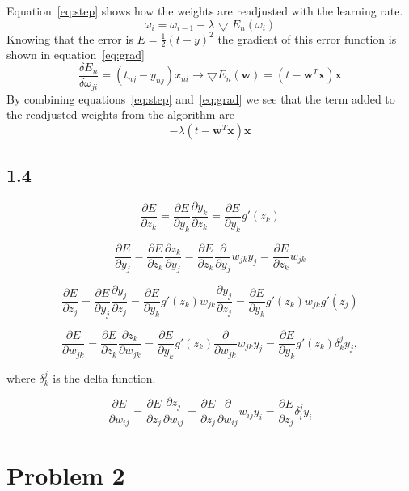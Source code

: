 \documentclass{article}
\begin{document}
Equation~\eqref{eq:step} shows how the weights are readjusted with the learning rate. 
\begin{equation}
\omega_i = \omega_{i-1} - \lambda\bigtriangledown E_n(\omega_i)
\label{eq:step}
\end{equation}
Knowing that the error is $E=\frac{1}{2}(t-y)^2$ the gradient of this error function is shown in equation~\eqref{eq:grad}
\begin{equation}
	\frac{\delta E_n}{\delta \omega_{ji}} = (t_{nj} - y_{nj})x_{ni} \rightarrow \bigtriangledown E_n(\textbf{w}) = (t - \textbf{w}^T\textbf{x})\textbf{x}
	\label{eq:grad}
\end{equation}
By combining equations~\eqref{eq:step} and~\eqref{eq:grad} we see that the term added to the readjusted weights from the algorithm are
\begin{equation*}
	-\lambda(t - \textbf{w}^T\textbf{x})\textbf{x}
	\label{eq:addterm}
\end{equation*}

\subsection*{1.4}

\begin{equation}
\frac{\partial E}{\partial z_k} = \frac{\partial E}{\partial y_k} \frac{\partial y_k}{\partial z_k} = \frac{\partial E}{\partial y_k} g'(z_k)
\end{equation}

\begin{equation}
\frac{\partial E}{\partial y_j} = \frac{\partial E}{\partial z_k} \frac{\partial z_k}{\partial y_j} =
\frac{\partial E}{\partial z_k} \frac{\partial}{\partial y_j} w_{jk} y_j =\frac{\partial E}{\partial z_k} w_{jk}
\end{equation}

\begin{equation}
\frac{\partial E}{\partial z_j} = \frac{\partial E}{\partial y_j} \frac{\partial y_j}{\partial z_j} = \frac{\partial E}{\partial y_k} g'(z_k) w_{jk} \frac{\partial y_j}{\partial z_j} = \frac{\partial E}{\partial y_k} g'(z_k) w_{jk} g'(z_j)
\end{equation}

\begin{equation}
\frac{\partial E}{\partial w_{jk}} = \frac{\partial E}{\partial z_k} \frac{\partial z_k}{\partial w_{jk}} = \frac{\partial E}{\partial y_k} g'(z_k) \frac{\partial}{\partial w_{jk}} w_{jk}y_{j} = \frac{\partial E}{\partial y_k} g'(z_k) \delta^j_k y_j,
\end{equation}

where $\delta^j_k$ is the delta function.

\begin{equation}
\frac{\partial E}{\partial w_{ij}} = \frac{\partial E}{\partial z_j} \frac{\partial z_j}{\partial w_{ij}} = \frac{\partial E}{\partial z_j} \frac{\partial}{\partial w_{ij}} w_{ij}y_i = \frac{\partial E}{\partial z_j} \delta^j_i y_i
\end{equation}

\section*{Problem 2}
\end{document}
